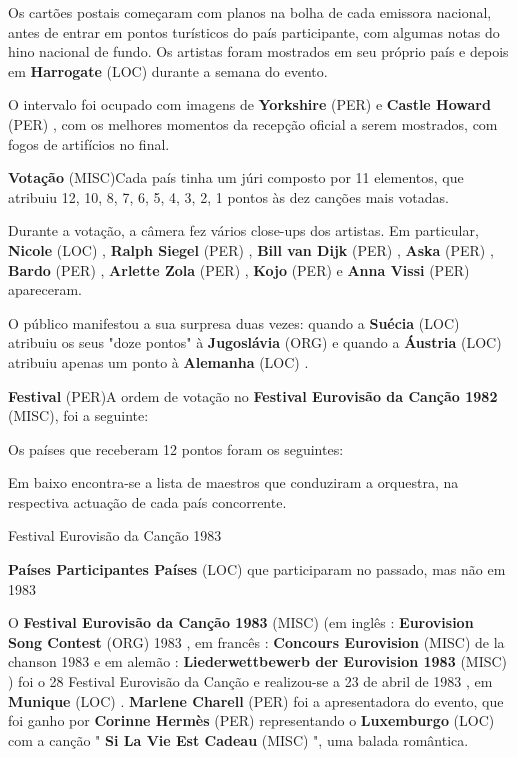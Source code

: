 \documentclass[12pt,a4paper]{article}
\begin{document}
Os cartões postais começaram com planos na bolha de cada emissora nacional, antes de entrar em pontos turísticos do país participante, com algumas notas do hino nacional de fundo. Os artistas foram mostrados em seu próprio país e depois em \textbf{Harrogate} (LOC) durante a semana do evento.

O intervalo foi ocupado com imagens de \textbf{Yorkshire} (PER) e \textbf{Castle Howard} (PER) , com os melhores momentos da recepção oficial a serem mostrados, com fogos de artifícios no final.



\textbf{Votação} (MISC)Cada país tinha um júri composto por 11 elementos, que atribuiu 12, 10, 8, 7, 6, 5, 4, 3, 2, 1 pontos às dez canções mais votadas.

Durante a votação, a câmera fez vários close-ups dos artistas. Em particular, \textbf{Nicole} (LOC) , \textbf{Ralph Siegel} (PER) , \textbf{Bill van Dijk} (PER) , \textbf{Aska} (PER) , \textbf{Bardo} (PER) , \textbf{Arlette Zola} (PER) , \textbf{Kojo} (PER) e \textbf{Anna Vissi} (PER) apareceram.

O público manifestou a sua surpresa duas vezes: quando a \textbf{Suécia} (LOC) atribuiu os seus "doze pontos" à \textbf{Jugoslávia} (ORG) e quando a \textbf{Áustria} (LOC) atribuiu apenas um ponto à \textbf{Alemanha} (LOC) .



\textbf{Festival} (PER)A ordem de votação no \textbf{Festival Eurovisão da Canção 1982} (MISC), foi a seguinte:

Os países que receberam 12 pontos foram os seguintes:

Em baixo encontra-se a lista de maestros que conduziram a orquestra, na respectiva actuação de cada país concorrente.



Festival Eurovisão da Canção 1983



\textbf{Países Participantes Países} (LOC) que participaram no passado, mas não em 1983

O \textbf{Festival Eurovisão da Canção 1983} (MISC) (em inglês : \textbf{Eurovision Song Contest} (ORG) 1983 , em francês : \textbf{Concours Eurovision} (MISC) de la chanson 1983 e em alemão : \textbf{Liederwettbewerb der Eurovision 1983} (MISC) ) foi o 28 Festival Eurovisão da Canção e realizou-se a 23 de abril de 1983 , em \textbf{Munique} (LOC) . \textbf{Marlene Charell} (PER) foi a apresentadora do evento, que foi ganho por \textbf{Corinne Hermès} (PER) representando o \textbf{Luxemburgo} (LOC) com a canção " \textbf{Si La Vie Est Cadeau} (MISC) ", uma balada romântica.
\end{document}
